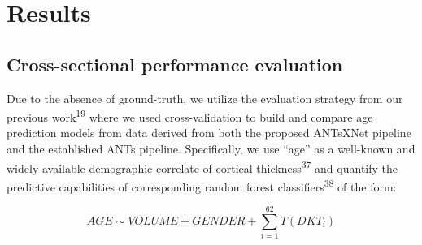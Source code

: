 \documentclass[12pt,]{article}
\begin{document}
\hypertarget{results}{%
\section*{Results}\label{results}}

\hypertarget{cross-sectional-performance-evaluation}{%
\subsection*{Cross-sectional performance
evaluation}\label{cross-sectional-performance-evaluation}}



Due to the absence of ground-truth, we utilize the evaluation strategy
from our previous work\textsuperscript{19} where we used
cross-validation to build and compare age prediction models from data
derived from both the proposed ANTsXNet pipeline and the established
ANTs pipeline. Specifically, we use ``age'' as a well-known and
widely-available demographic correlate of cortical
thickness\textsuperscript{37} and quantify the predictive capabilities
of corresponding random forest classifiers\textsuperscript{38} of the
form:

\begin{equation}
AGE \sim VOLUME + GENDER + \sum_{i=1}^{62} T(DKT_i)
\end{equation}
\end{document}
